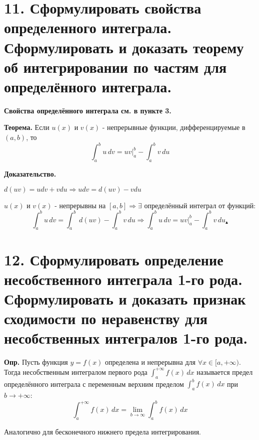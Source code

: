 \documentclass[11pt]{article}
\begin{document}
\section*{11. Сформулировать свойства определенного интеграла. Сформулировать и доказать теорему об интегрировании по частям для определённого интеграла.}
\par\textbf{Свойства определённого интеграла см. в пункте 3.}
\par\textbf{Теорема.} Если $u(x)$ и $v(x)$ - непрерывные функции, дифференцируемые в $(a, b)$, то $$\int_{a}^b u \, dv = uv\vert_{a}^b - \int_{a}^b v \, du$$
\par\textbf{Доказательство.}
\par $d(uv) = udv + vdu \Rightarrow udv = d(uv) - vdu$
\par $u(x)$ и $v(x)$ - непрерывны на $[a, b] \Rightarrow \exists$ определённый интеграл от функций: $$\int_{a}^b u \, dv = \int_{a}^b \, d(uv) - \int_{a}^b v\, du \Rightarrow \int_{a}^b u\, dv = uv \vert_{a}^b - \int_{a}^b v \, du _{\blacktriangle}$$

\section*{12. Сформулировать определение несобственного интеграла 1-го рода. Сформулировать и доказать признак сходимости по неравенству для несобственных интегралов 1-го рода.}
\par\textbf{Опр.} Пусть функция $y = f(x)$ определена и непрерывна для $\forall x \in [a, +\infty)$. Тогда несобственным интегралом первого рода $\int_{a}^{+\infty} f(x) \, dx$ называется предел определённого интеграла с переменным верхним пределом $\int_{a}^{b} f(x) \, dx$ при $b \to +\infty$:$$\int_{a}^{+\infty} f(x) \, dx = \lim_{ b \to \infty}{\int_{a}^b f(x) \, dx }$$
\par Аналогично для бесконечного нижнего предела интегрирования.
\end{document}
